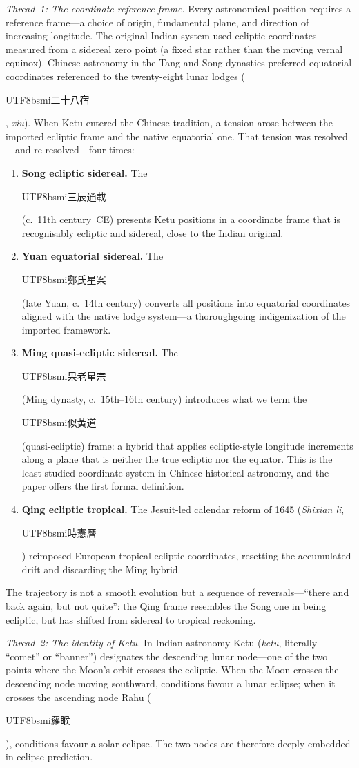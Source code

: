 \documentclass[10pt,a4paper]{article}
\newcommand{\zh}[1]{\begin{CJK}{UTF8}{bsmi}#1\end{CJK}}
\begin{document}
\textit{Thread~1: The coordinate reference frame.}  Every astronomical position
requires a reference frame---a choice of origin, fundamental plane, and direction
of increasing longitude.  The original Indian system used ecliptic coordinates
measured from a sidereal zero point (a fixed star rather than the moving
vernal equinox).  Chinese astronomy in the Tang and Song dynasties preferred
equatorial coordinates referenced to the twenty-eight lunar lodges (\zh{二十八宿},
\textit{xiu}).  When Ketu entered the Chinese tradition, a tension arose between
the imported ecliptic frame and the native equatorial one.  That tension was
resolved---and re-resolved---four times:
\begin{enumerate}[leftmargin=*, label=(\arabic*)]
  \item \textbf{Song ecliptic sidereal.}  The \zh{三辰通載} (c.~11th century~CE)
    presents Ketu positions in a coordinate frame that is recognisably ecliptic
    and sidereal, close to the Indian original.
  \item \textbf{Yuan equatorial sidereal.}  The \zh{鄭氏星案} (late Yuan, c.~14th
    century) converts all positions into equatorial coordinates aligned with the
    native lodge system---a thoroughgoing indigenization of the imported framework.
  \item \textbf{Ming quasi-ecliptic sidereal.}  The \zh{果老星宗} (Ming dynasty,
    c.~15th--16th century) introduces what we term the \zh{似黃道} (quasi-ecliptic)
    frame: a hybrid that applies ecliptic-style longitude increments along a plane
    that is neither the true ecliptic nor the equator.  This is the least-studied
    coordinate system in Chinese historical astronomy, and the paper offers the
    first formal definition.
  \item \textbf{Qing ecliptic tropical.}  The Jesuit-led calendar reform of 1645
    (\textit{Shixian li}, \zh{時憲曆}) reimposed European tropical ecliptic
    coordinates, resetting the accumulated drift and discarding the Ming hybrid.
\end{enumerate}
The trajectory is not a smooth evolution but a sequence of reversals---``there
and back again, but not quite'': the Qing frame resembles the Song one in being
ecliptic, but has shifted from sidereal to tropical reckoning.

\textit{Thread~2: The identity of Ketu.}  In Indian astronomy Ketu (\textit{ketu},
literally ``comet'' or ``banner'') designates the descending lunar node---one of
the two points where the Moon's orbit crosses the ecliptic.  When the Moon crosses
the descending node moving southward, conditions favour a lunar eclipse; when
it crosses the ascending node Rahu (\zh{羅睺}), conditions favour a solar eclipse.
The two nodes are therefore deeply embedded in eclipse prediction.
\end{document}
